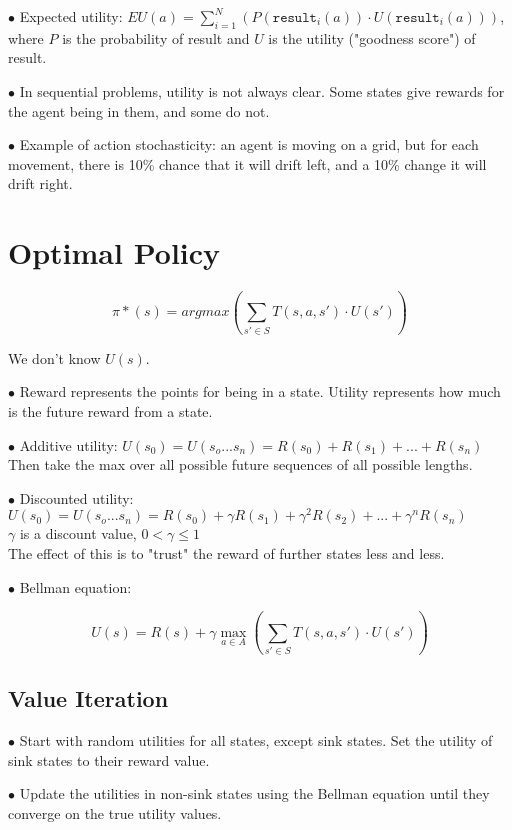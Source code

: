 \documentclass[english,openany]{book}
\begin{document}
    $\bullet$ Expected utility: $EU(a) = \sum_{i=1}^{N} (P(\texttt{result}_i (a)) \cdot U(\texttt{result}_i (a)))$, where $P$ is the probability of result and $U$ is the utility ("goodness score") of result.
    
    $\bullet$ In sequential problems, utility is not always clear. Some states give rewards for the agent being in them, and some do not.
    
    $\bullet$ Example of action stochasticity: an agent is moving on a grid, but for each movement, there is 10\% chance that it will drift left, and a 10\% change it will drift right.
    
    
    \section{Optimal Policy}
    
    $$\pi*(s) = argmax(\sum_{s' \in S} T(s, a, s') \cdot U(s'))$$
    
    We don't know $U(s)$.
    
    $\bullet$ Reward represents the points for being in a state. Utility represents how much is the future reward from a state.
    
    $\bullet$ Additive utility: $U(s_0) = U(s_o ... s_n) = R(s_0) + R(s_1) + ... + R(s_n)$\\
    Then take the max over all possible future sequences of all possible lengths.
    
    $\bullet$ Discounted utility: $U(s_0) = U(s_o ... s_n) = R(s_0) + \gamma R(s_1) + \gamma^2 R(s_2) + ... + \gamma^n R(s_n)$\\
    $\gamma$ is a discount value, $0 < \gamma \leq 1$\\
    The effect of this is to "trust" the reward of further states less and less.
    
    $\bullet$ Bellman equation: 
    
    $$ U(s) = R(s) + \gamma \max_{a \in A} (\sum_{s' \in S} T(s, a, s') \cdot U(s')) $$
    
    \subsection{Value Iteration}
    
    $\bullet$ Start with random utilities for all states, except sink states. Set the utility of sink states to their reward value.
    
    $\bullet$ Update the utilities in non-sink states using the Bellman equation until they converge on the true utility values.
    
\end{document}
